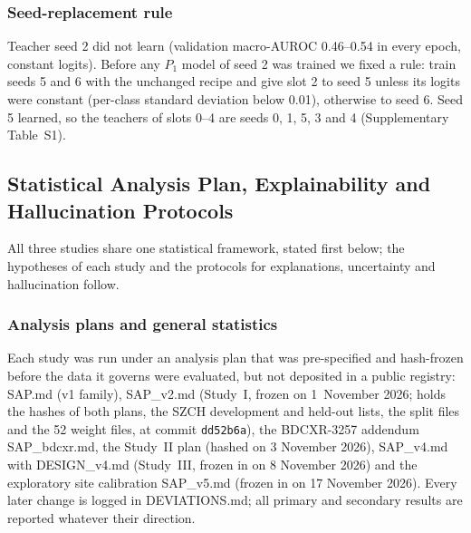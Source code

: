 \subsubsection{Seed-replacement rule}
Teacher seed 2 did not learn (validation macro-AUROC 0.46--0.54 in every epoch, constant logits). Before any $P_1$ model of seed 2 was
trained we fixed a rule: train seeds 5 and 6 with the unchanged recipe and give slot 2 to seed 5 unless its logits were constant (per-class
standard deviation below 0.01), otherwise to seed 6. Seed 5 learned, so the teachers of slots 0--4 are seeds 0, 1, 5, 3 and 4
(Supplementary Table~S1).

\subsection{Statistical Analysis Plan, Explainability and Hallucination Protocols}
\label{sec:m-stats}

All three studies share one statistical framework, stated first below; the hypotheses of each study and the protocols for explanations,
uncertainty and hallucination follow.

\subsubsection{Analysis plans and general statistics}
Each study was run under an analysis plan that was pre-specified and hash-frozen before the data it governs were evaluated, but not
deposited in a public registry: SAP.md (v1 family), SAP\_v2.md (Study~I, frozen on 1~November 2026;  holds the hashes
of both plans, the SZCH development and held-out lists, the split files and the 52 weight files, at commit \texttt{dd52b6a}), the
BDCXR-3257 addendum SAP\_bdcxr.md, the Study~II plan (hashed on 3 November 2026), SAP\_v4.md with DESIGN\_v4.md (Study~III, frozen in
 on 8 November 2026) and the exploratory site calibration SAP\_v5.md (frozen in  on 17 November
2026). Every later change is logged in DEVIATIONS.md; all primary and secondary results are reported
whatever their direction.

